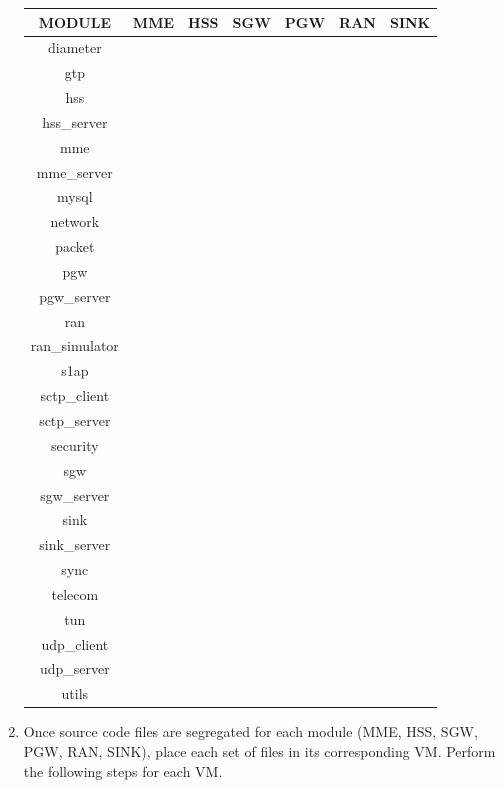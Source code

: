 \pdfminorversion=4\documentclass[hidelinks]{report}
\newcommand{\T} {
	\checkmark
}
\begin{document}
\begin{enumerate}
\begin{table}[H]
\begin{tabular}{|c|c|c|c|c|c|c|}
\hline
\textbf{MODULE} & \textbf{MME} & \textbf{HSS} & \textbf{SGW} & \textbf{PGW} & \textbf{RAN} & \textbf{SINK} \\
\hline
diameter & \T & \T & \T & \T & \T & \T \\
gtp & \T & \T & \T & \T & \T & \T \\
hss & & \T & & & & \\
hss\_server & & \T & & & & \\
mme & \T & & & & & \\
mme\_server & \T & & & & & \\
mysql & & \T & & & & \\
network & \T & \T & \T & \T & \T & \T \\
packet & \T & \T & \T & \T & \T & \T \\
pgw & & & & \T & & \\
pgw\_server & & & & \T & & \\
ran & & & & & \T & \\
ran\_simulator & & & & & \T & \\
s1ap & \T & \T & \T & \T & \T & \T \\
sctp\_client & \T & & & & \T & \\
sctp\_server & \T & \T & & & & \\
security & \T & & & & \T & \\
sgw & & & \T & & & \\
sgw\_server & & & \T & & & \\
sink & & & & & & \T \\
sink\_server & & & & & & \T \\
sync & \T & \T & \T & \T & \T & \\
telecom & \T & & & & \T & \\
tun & & & & & \T & \T \\
udp\_client & \T & & \T & \T & \T & \T \\
udp\_server & & & \T & \T & \T & \T \\
utils & \T & \T & \T & \T & \T & \T \\
\hline

\end{tabular}

\end{table}

\item Once source code files are segregated for each module (MME, HSS, SGW, PGW, RAN, SINK), place each set of files in its corresponding VM. Perform the following steps for each VM.

\begin{enumerate}


\end{enumerate}
\end{enumerate}
\end{document}
